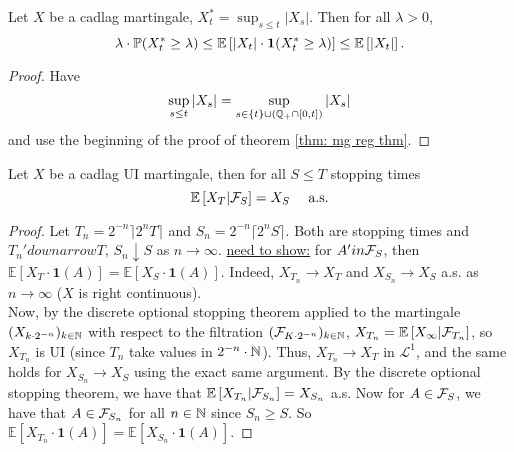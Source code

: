 \documentclass{article}
\begin{document}
\begin{theorem}\label{thm: doob maximal ineq cont time}
Let $ X$ be a cadlag martingale, $ X^{*}_{t} = \displaystyle\sup_{s\leq t}|X_{s}|$. Then for all $ \lambda>0$, 
\[
\lambda\cdot \mathbb{P}(X^{*}_{t}\geq \lambda)\leq \mathbb{E}\left[ |X_{t}|\cdot \mathbf{1}(X^{*}_{t}\geq \lambda) \right] \leq \mathbb{E}\left[ |X_{t}| \right].
\]

\end{theorem}

\begin{proof}
    Have 
    \[
	    \displaystyle\sup_{s\leq t}|X_{s}| = \displaystyle\sup_{s\in \{t\}\cup(\mathbb{Q}_{+}\cap[0,t])}|X_{s}|
    \]
    and use the beginning of the proof of theorem \ref{thm: mg reg thm}.
\end{proof}


\begin{theorem}\label{thm: ost for UI }
Let $ X$ be a cadlag UI martingale, then for all $ S\leq T$ stopping times 
\[
	\mathbb{E}\left[  X_{T}|\mathcal{F}_{S} \right] = X_{S} \quad \text{ a.s.}
\]
\end{theorem}


\begin{proof}
	Let $ T_{n} = 2^{-n}\rceil 2^nT\rceil$ and $ S_{n} = 2^{-n}\lceil 2^n S\rceil$. Both are stopping times and $ T_{n}'downarrow T$, $S_{n}\downarrow S $ as $ n\to \infty$. \underline{need to show:} for $ A'in \mathcal{F}_{S}$, then $ \mathbb{E}\left[ X_{T}\cdot \mathbf{1}(A) \right] = \mathbb{E}\left[ X_{S}\cdot \mathbf{1}(A) \right]$. Indeed, $ X_{T_{n}}\to X_{T}$ and $ X_{S_{n}}\to X_{S}$ a.s. as $ n\to \infty$ ($ X$ is right continuous).\\ 

	Now, by the discrete optional stopping theorem applied to the martingale $ (X_{k\cdot 2^{-n}})_{k\in \mathbb{N}}$ with respect to the filtration $ (\mathcal{F}_{K\cdot 2^{-n}})_{k\in \mathbb{N}}$, $ X_{T_{n}}= \mathbb{E}\left[ X_{\infty}|\mathcal{F}_{T_{n}} \right]$, so $ X_{T_{n}}$ is UI  (since $ T_{n}$ take values in $ 2^{-n}\cdot \mathbb{N}$). Thus, $ X_{T_{n}}\to X_{T}$ in $ \mathcal{L}^{1} $, and the same holds for $ X_{S_{n}}\to X_{S}$ using the exact same argument. By the discrete optional stopping theorem, we have that $ \mathbb{E}\left[ X_{T_{n}}|\mathcal{F}_{S_{n}} \right] = X_{S_{n}}$ a.s. Now for $ A\in \mathcal{F}_{S}$, we have that $ A\in \mathcal{F}_{S_{n}}$ for all $ n\in \mathbb{N}$ since $ S_{n}\geq S$. So $ \mathbb{E}\left[ X_{T_{n}}\cdot \mathbf{1}(A) \right] = \mathbb{E}\left[ X_{S_{n}}\cdot \mathbf{1}(A) \right]$.
\end{proof}
\end{document}

